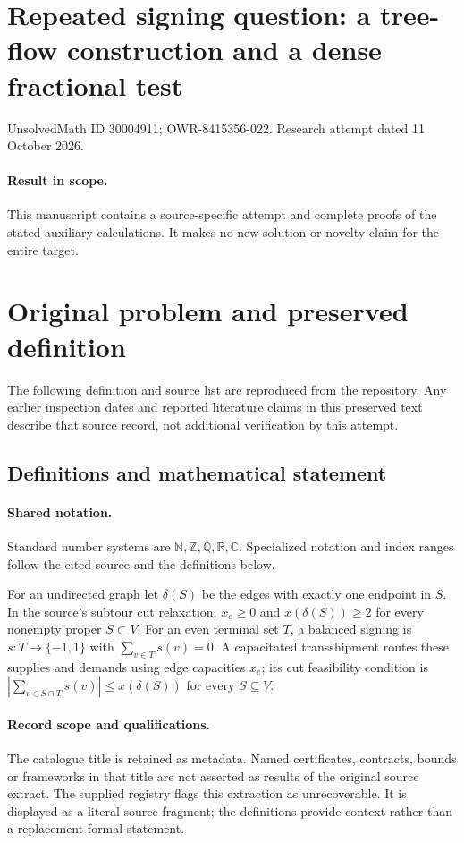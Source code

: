 \documentclass[11pt]{article}
\begin{document}
\section*{Repeated signing question: a tree-flow construction and a dense fractional test}
\noindent UnsolvedMath ID 30004911; OWR-8415356-022. Research attempt dated 11 October 2026.
\paragraph{Result in scope.}This manuscript contains a source-specific attempt and complete proofs of the stated auxiliary calculations. It makes no new solution or novelty claim for the entire target.
\section{Original problem and preserved definition}
The following definition and source list are reproduced from the repository. Any earlier inspection dates and reported literature claims in this preserved text describe that source record, not additional verification by this attempt.
\subsection{Definitions and mathematical statement}

\paragraph{Shared notation.}Standard number systems are $\mathbb N,\mathbb Z,\mathbb Q,\mathbb R,\mathbb C$. Specialized notation and index ranges follow the cited source and the definitions below.


For an undirected graph let $\delta(S)$ be the edges with exactly one endpoint in $S$. In the source's subtour cut relaxation, $x_e\geq0$ and $x(\delta(S))\geq2$ for every nonempty proper $S\subset V$. For an even terminal set $T$, a balanced signing is $s:T\to\{-1,1\}$ with $\sum_{v\in T}s(v)=0$. A capacitated transshipment routes these supplies and demands using edge capacities $x_e$; its cut feasibility condition is $|\sum_{v\in S\cap T}s(v)|\leq x(\delta(S))$ for every $S\subseteq V$.
\paragraph{Record scope and qualifications.}
The catalogue title is retained as metadata. Named certificates, contracts, bounds or frameworks in that title are not asserted as results of the original source extract.
The supplied registry flags this extraction as unrecoverable. It is displayed as a literal source fragment; the definitions provide context rather than a replacement formal statement.
\end{document}
